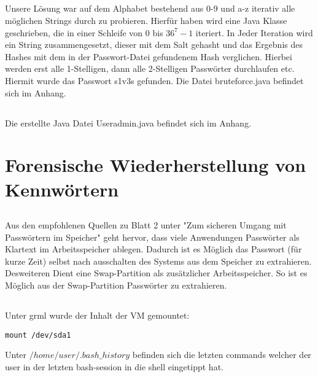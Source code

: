 \documentclass[11pt]{article}
\theoremstyle{plain}
\begin{document}
\subsection{}
Unsere Lösung war auf dem Alphabet bestehend aus 0-9 und a-z iterativ alle möglichen Strings durch zu probieren. Hierfür haben wird eine Java Klasse geschrieben, die in einer Schleife von 0 bis $36^7-1$ iteriert. In Jeder Iteration wird ein String zusammengesetzt, dieser mit dem Salt gehasht und das Ergebnis des Hashes mit dem in der Passwort-Datei gefundenem Hash verglichen. Hierbei werden erst alle 1-Stelligen, dann alle 2-Stelligen Passwörter durchlaufen etc. Hiermit wurde das Passwort s1v3s gefunden. Die Datei bruteforce.java befindet sich im Anhang.
\subsection{}
Die erstellte Java Datei Useradmin.java befindet sich im Anhang.
\section{Forensische Wiederherstellung von Kennwörtern}
\subsection{}
Aus den empfohlenen Quellen zu Blatt 2 unter "Zum sicheren Umgang mit Passwörtern im Speicher" geht hervor, dass viele Anwendungen Passwörter als Klartext im Arbeitsspeicher ablegen. Dadurch ist es Möglich das Passwort (für kurze Zeit) selbst nach ausschalten des Systems aus dem Speicher zu extrahieren. Desweiteren Dient eine Swap-Partition als zusätzlicher Arbeitsspeicher. So ist es Möglich aus der Swap-Partition Passwörter zu extrahieren.
\subsection{}
Unter grml wurde der Inhalt der VM gemountet:
\begin{lstlisting} 
mount /dev/sda1
\end{lstlisting}
Unter $/home/user/.bash\_history$ befinden sich die letzten commands welcher der user in der letzten bash-session in die shell eingetippt hat.
\end{document}
